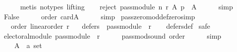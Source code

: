 \begin{isabellebody}
\ \ \ \ \isamarkupfalse%
\ {\isacharparenleft}{\kern0pt}metis\ {\isacharparenleft}{\kern0pt}no{\isacharunderscore}{\kern0pt}types{\isacharcomma}{\kern0pt}\ lifting{\isacharparenright}{\kern0pt}{\isacharparenright}{\kern0pt}\isanewline
\ \ \isamarkupfalse%
\ {\isachardoublequoteopen}reject\ {\isacharparenleft}{\kern0pt}pass{\isacharunderscore}{\kern0pt}module\ n\ r{\isacharparenright}{\kern0pt}\ A\ p\ {\isasymnoteq}\ A{\isachardoublequoteclose}\isanewline
\ \ \ \ \isamarkupfalse%
\ simp\isanewline
\ \ \isamarkupfalse%
\ {\isachardoublequoteopen}False{\isachardoublequoteclose}\isanewline
\ \ \ \ \isamarkupfalse%
\ order\ card{\isacharunderscore}{\kern0pt}A\isanewline
\ \ \ \ \isamarkupfalse%
\ simp\isanewline
{}\isamarkupfalse%
%
\endisatagproof
{\isafoldproof}%
%
\isadelimproof
\isanewline
%
\endisadelimproof
\isanewline
{}\isamarkupfalse%
\ pass{\isacharunderscore}{\kern0pt}zero{\isacharunderscore}{\kern0pt}mod{\isacharunderscore}{\kern0pt}def{\isacharunderscore}{\kern0pt}zero{\isacharbrackleft}{\kern0pt}simp{\isacharbrackright}{\kern0pt}{\isacharcolon}{\kern0pt}\isanewline
\ \ \ order{\isacharcolon}{\kern0pt}\ {\isachardoublequoteopen}linear{\isacharunderscore}{\kern0pt}order\ r{\isachardoublequoteclose}\isanewline
\ \ \ {\isachardoublequoteopen}defers\ {}\ {\isacharparenleft}{\kern0pt}pass{\isacharunderscore}{\kern0pt}module\ {}\ r{\isacharparenright}{\kern0pt}{\isachardoublequoteclose}\isanewline
%
\isadelimproof
\ \ %
\endisadelimproof
%
\isatagproof
{}\isamarkupfalse%
\ defers{\isacharunderscore}{\kern0pt}def\isanewline
{}\isamarkupfalse%
\ {\isacharparenleft}{\kern0pt}safe{\isacharparenright}{\kern0pt}\isanewline
\ \ \isamarkupfalse%
\ {\isachardoublequoteopen}electoral{\isacharunderscore}{\kern0pt}module\ {\isacharparenleft}{\kern0pt}pass{\isacharunderscore}{\kern0pt}module\ {}\ r{\isacharparenright}{\kern0pt}{\isachardoublequoteclose}\isanewline
\ \ \ \ \isamarkupfalse%
\ pass{\isacharunderscore}{\kern0pt}mod{\isacharunderscore}{\kern0pt}sound\ order\isanewline
\ \ \ \ \isamarkupfalse%
\ simp\isanewline
{}\isamarkupfalse%
\isanewline
\ \ \isamarkupfalse%
\isanewline
\ \ \ \ A\ {\isacharcolon}{\kern0pt}{\isacharcolon}{\kern0pt}\ {\isachardoublequoteopen}{\isacharprime}{\kern0pt}a\ set{\isachardoublequoteclose}\ \isanewline

\end{isabellebody}
